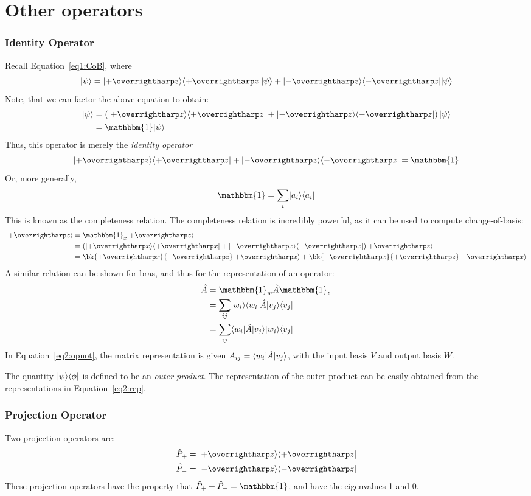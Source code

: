 \section{Other operators}
\subsubsection{Identity Operator}
Recall Equation~\ref{eq1:CoB}, where 
\[\k\p = \k{+\vv z}\b{+\vv z}\k\p+\k{-\vv{z}}\b{-\vv{z}}\k\p\]
Note, that we can factor the above equation to obtain:
\begin{align*}
	\k\p &= \left(\k{+\vv z}\b{+\vv z}+\k{-\vv{z}}\b{-\vv{z}}\right)\k\p\\
     &= \mathbbm{1} \k\p
\end{align*}
Thus, this operator is merely the \emph{identity operator}
\begin{equation}
	\k{+\vv z}\b{+\vv z}+\k{-\vv{z}}\b{-\vv{z}}=\mathbbm{1}
\end{equation}
Or, more generally,
\begin{equation}
	\mathbbm{1}=\sum_i\k{a_i}\b{a_i}\label{eq2:completeness}
\end{equation}
This is known as the completeness relation. The completeness relation is incredibly powerful, as it can be used to compute change-of-basis:
\begin{align*}
	\k{+\vv z}&=\mathbbm{1}_x \k{+\vv z}\\
		  &=(\k{+\vv x}\b{+\vv x}+\k{-\vv x}\b{-\vv x})\k{+\vv z}\\
		  &=\bk{+\vv x}{+\vv z}\k{+\vv x}+\bk{-\vv x}{+\vv z}\k{-\vv x}
\end{align*}
A similar relation can be shown for bras, and thus for the representation of an operator:
\begin{align}
	\hat A &= \mathbbm{1}_w\hat{A}\mathbbm{1}_z\nonumber\\
	       &= \sum_{ij}\k{w_i}\b{w_i}\hat{A}\k{v_j}\b{v_j}\nonumber\\
	       &= \sum_{ij}\b{w_i}\hat{A}\k{v_j}\k{w_i}\b{v_j}\label{eq2:opnot}
\end{align}
In Equation~\ref{eq2:opnot}, the matrix representation is given \(A_{ij}=\langle w_i\rvert\hat{A}\lvert v_j\rangle\), with the input basis \(V\) and output basis \(W\).

The quantity \(\lvert\psi\rangle\langle\phi\rvert\) is defined to be an \emph{outer product}. The representation of the outer product can be easily obtained from the representations in Equation~\ref{eq2:rep}.

\subsubsection{Projection Operator}
Two projection operators are:
\begin{subequations}
	\begin{align}
		\hat{P}_+&=\k{+\vv z}\b{+\vv z}\\
		\hat{P}_-&=\k{-\vv z}\b{-\vv z}
	\end{align}
\end{subequations}
These projection operators have the property that \(\hat P_++\hat P_-=\mathbbm{1}\), and have the eigenvalues 1 and 0.

